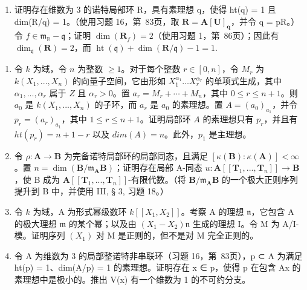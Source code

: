 \begin{enumerate}
\def\labelenumi{\alph{enumi})}
\setcounter{enumi}{1}
\tightlist
\item
  证明存在维数为 3 的诺特局部环 R，具有素理想 q，使得 ht(q) = 1 且 dim(R/q) = 1。（使用习题 16，第~83页，取 \(\mathbf{R} = \mathbf{A}[\mathbf{U}]_{\mathbf{q}}\)，并令 q = pR。）令 \(f \in \mathfrak{m}_{\mathbb{R}} - \mathfrak{q}\)；证明 \(\dim(\mathbf{R}_{f}) = 2\)（使用习题 1，第~86页）；因此有 \(\dim_{\mathfrak{q}}(\mathbf{R}) = 2\)，而 \(\operatorname{ht}(\mathfrak{q}) + \dim(\mathbf{R}/\mathfrak{q}) - 1 = 1.\)
\end{enumerate}

\begin{enumerate}
\def\labelenumi{\arabic{enumi})}
\setcounter{enumi}{3}
\item
  令 \(k\) 为域，令 \(n\) 为整数 \(\geqslant 1\)。对于每个整数 \(r \in [0, n]\)，令 \(M_r\) 为 \(k(X_1, ..., X_n)\) 的向量子空间，它由形如 \(X_1^{\alpha_1}\ldots X_r^{\alpha_r}\) 的单项式生成，其中 \(\alpha_1, ..., \alpha_r\) 属于 \(Z\) 且 \(\alpha_r > 0\)。置 \(a_r = M_r + \cdots + M_n\)，其中 \(0 \leqslant r \leqslant n + 1\)。则 \(a_0\) 是 \(k(X_1, ..., X_n)\) 的子环，而 \(a_r\) 是 \(a_0\) 的素理想。置 \(A = (a_0)_{a_1}\)，并令 \(p_r = (a_r)_{a_1}\)，其中 \(1 \leqslant r \leqslant n + 1\)。证明局部环 \(A\) 的素理想只有 \(p_r\)，并且有 \(ht(p_r) = n + 1 - r\) 以及 \(dim(A) = n\)。此外，\(p_1\) 是主理想。
\item
  令 \(\rho: \mathbf{A} \to \mathbf{B}\) 为完备诺特局部环的局部同态，且满足 \([\kappa(\mathbf{B}): \kappa(\mathbf{A})] < \infty\)。置 \(n = \dim(\mathbf{B}/\mathfrak{m}_{\mathbf{A}}\mathbf{B})\)；证明存在局部 A-同态 \(u: \mathbf{A}[[\mathbf{T}_1, ..., \mathbf{T}_n]] \to \mathbf{B}\)，使 B 成为 \(\mathbf{A}[[\mathbf{T}_1, ..., \mathbf{T}_n]]\)-有限代数。（将 \(\mathbf{B}/\mathfrak{m}_{\mathbf{A}}\mathbf{B}\) 的一个极大正则序列提升到 B 中，并使用 III, § 3, 习题 18。）
\item
  令 \(k\) 为域，A 为形式幂级数环 \(k[[X_1, X_2]]\)。考察 A 的理想 \(\mathfrak{n}\)，它包含 A 的极大理想 \(\mathfrak{m}\) 的某个幂；以及由 \((X_1 - X_2)\mathfrak{n}\) 生成的理想 I。令 M 为 A/I-模。证明序列 \((X_1)\) 对 M 是正则的，但不是对 M 完全正则的。
\item
  令 A 为维数为 3 的局部整诺特非串联环（习题 16，第~83页），p ⊂ A 为满足 ht(p) = 1、dim(A/p) = 1 的素理想。证明存在 x ∈ p，使得 p 在包含 Ax 的素理想中是极小的。推出 V(x) 有一个维数为 1 的不可约分支。
\end{enumerate}

